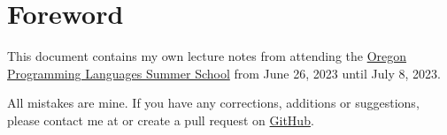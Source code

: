 \section{Foreword}

This document contains my own lecture notes from attending the 
\href{https://www.cs.uoregon.edu/research/summerschool/summer23/}{Oregon Programming Languages Summer School}
from June 26, 2023 until July 8, 2023.

All mistakes are mine. If you have any corrections, additions or suggestions, please contact me
at \emaillink or create a pull request on \href{https://github.com/Eladkay/OPLSS23LectureNotes}{GitHub}.
